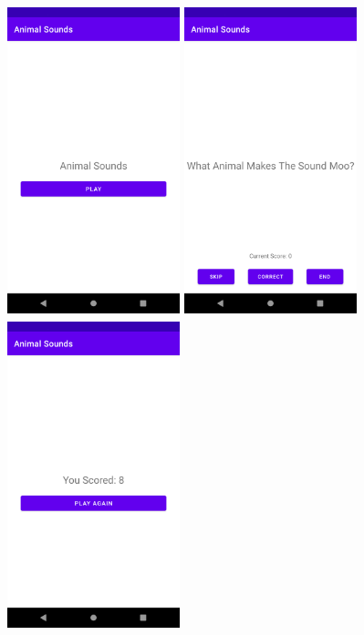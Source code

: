 \documentclass{article}
\begin{document}
\includegraphics[width=5cm, height=9cm]{../tex/img/practicals/03-animal-sounds-1.png}
\includegraphics[width=5cm, height=9cm]{../tex/img/practicals/03-animal-sounds-2.png}
\includegraphics[width=5cm, height=9cm]{../tex/img/practicals/03-animal-sounds-3.png} \\
\end{document}
